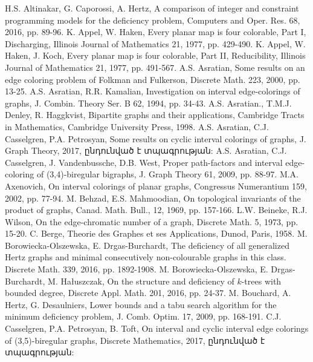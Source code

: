  H.S. Altinakar, G. Caporossi, A. Hertz, A comparison of integer and constraint programming models for the deficiency problem, Computers and Oper. Res. 68, 2016, pp. 89-96.
 K. Appel, W. Haken, Every planar map is four colorable, Part I, Discharging, Illinois Journal of Mathematics 21, 1977, pp. 429-490.
 K. Appel, W. Haken, J. Koch, Every planar map is four colorable, Part II, Reducibility, Illinois Journal of Mathematics 21, 1977, pp. 491-567.
 A.S. Asratian, Some results on an edge coloring problem of Folkman and Fulkerson, Discrete Math. 223, 2000, pp. 13-25.
 A.S. Asratian, R.R. Kamalian, Investigation on interval edge-colorings of graphs, J. Combin. Theory Ser. B 62, 1994, pp. 34-43. 
 A.S. Asratian., T.M.J. Denley, R. Haggkvist, Bipartite graphs and their applications, Cambridge Tracts in Mathematics, Cambridge University Press, 1998.
 A.S. Asratian, C.J. Casselgren, P.A. Petrosyan, Some results on cyclic interval colorings of graphs, J. Graph Theory, 2017, ընդունված է տպագրության:
 A.S. Asratian, C.J. Casselgren, J. Vandenbussche, D.B. West, Proper path-factors and interval edge-coloring of (3,4)-biregular bigraphs, J. Graph Theory 61, 2009, pp. 88-97.
 M.A. Axenovich, On interval colorings of planar graphs, Congressus Numerantium 159, 2002, pp. 77-94.
 M. Behzad, E.S. Mahmoodian, On topological invariants of the product of graphs, Canad. Math. Bull., 12, 1969, pp. 157-166.
 L.W. Beineke, R.J. Wilson, On the edge-chromatic number of a graph, Discrete Math. 5, 1973, pp. 15-20.
 C. Berge, Theorie des Graphes et ses Applications, Dunod, Paris, 1958.
 M. Borowiecka-Olszewska, E. Drgas-Burchardt, The deficiency of all generalized Hertz graphs and minimal consecutively non-colourable graphs in this class. Discrete Math. 339, 2016, pp. 1892-1908.
 M. Borowiecka-Olszewska, E. Drgas-Burchardt, M. Ha\l uszczak, On the structure and deficiency of $k$-trees with bounded degree, Discrete Appl. Math. 201, 2016, pp. 24-37.
 M. Bouchard, A. Hertz, G. Desaulniers, Lower bounds and a tabu search algorithm for the minimum deficiency problem, J. Comb. Optim. 17, 2009, pp. 168-191.
 C.J. Casselgren, P.A. Petrosyan, B. Toft, On interval and cyclic interval edge colorings of (3,5)-biregular graphs, Discrete Mathematics, 2017, ընդունված է տպագրության:
